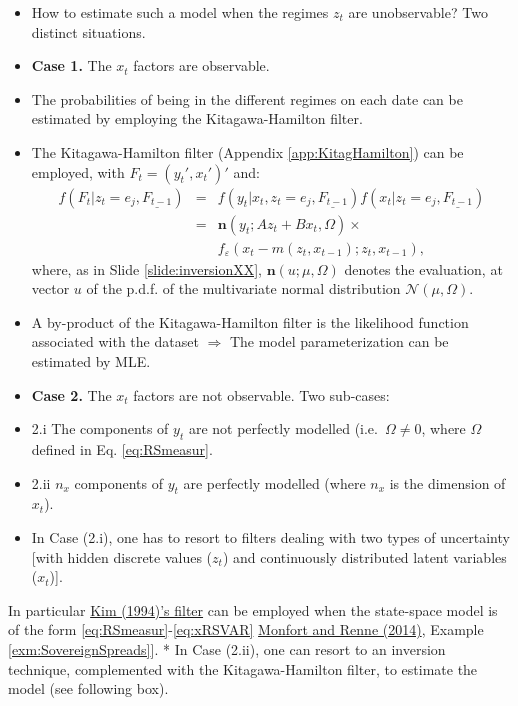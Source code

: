 \documentclass[
  12pt,
]{book}
\theoremstyle{definition}
\theoremstyle{definition}
\theoremstyle{definition}
\theoremstyle{definition}
\theoremstyle{remark}
\begin{document}
\begin{itemize}
\item
  How to estimate such a model when the regimes \(z_t\) are unobservable? Two distinct situations.
\item
  \textbf{Case 1.} The \(x_t\) factors are observable.
\item
  The probabilities of being in the different regimes on each date can be estimated by employing the Kitagawa-Hamilton filter.
\item
  The Kitagawa-Hamilton filter (Appendix \ref{app:KitagHamilton}) can be employed, with \(F_t = (y_t',x_t')'\) and:
  \begin{eqnarray*}
  f(F_t|z_t=e_j,\underline{F_{t-1}}) &=& f(y_t|x_t,z_t=e_j,\underline{F_{t-1}})f(x_t|z_t=e_j,\underline{F_{t-1}}) \\
  &=& \mathbf{n}(y_t;A z_t + B x_t,\Omega) \times \\
  &&f_{\varepsilon}(x_t - m(z_t,x_{t-1});z_t,x_{t-1}),
  \end{eqnarray*}
  where, as in Slide \ref{slide:inversionXX}, \(\mathbf{n}(u;\mu,\Omega)\) denotes the evaluation, at vector \(u\) of the p.d.f. of the multivariate normal distribution \(\mathcal{N}(\mu,\Omega)\).
\item
  A by-product of the Kitagawa-Hamilton filter is the likelihood function associated with the dataset \(\Rightarrow\) The model parameterization can be estimated by MLE.
\item
  \textbf{Case 2.} The \(x_t\) factors are not observable. Two sub-cases:
\item
  2.i The components of \(y_t\) are not perfectly modelled (i.e.~\(\Omega \ne 0\), where \(\Omega\) defined in Eq. \eqref{eq:RSmeasur}.
\item
  2.ii \(n_x\) components of \(y_t\) are perfectly modelled (where \(n_x\) is the dimension of \(x_t\)).
\item
  In Case (2.i), one has to resort to filters dealing with two types of uncertainty {[}with hidden discrete values (\(z_t\)) and continuously distributed latent variables (\(x_t\)){]}.
\end{itemize}

In particular \href{https://www.sciencedirect.com/science/article/pii/0304407694900361}{Kim (1994)'s filter} can be employed when the state-space model is of the form \eqref{eq:RSmeasur}-\eqref{eq:xRSVAR} \href{https://academic.oup.com/rof/article/18/6/2103/1661774}{Monfort and Renne (2014)}, Example \ref{exm:SovereignSpreads}{]}.
* In Case (2.ii), one can resort to an inversion technique, complemented with the Kitagawa-Hamilton filter, to estimate the model (see following box).
\end{document}
